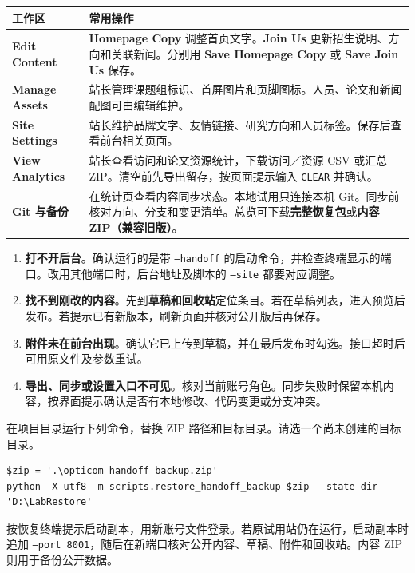\documentclass[UTF8,a4paper,zihao=-4,fontset=none]{ctexart}
\newcommand{\key}[1]{\textsf{\textbf{#1}}}
\newcommand{\topic}[1]{\par\vspace{9pt}{\large\sffamily\bfseries\color{navy}#1}\par\vspace{1pt}}
\begin{document}
\begin{tabularx}{\linewidth}{@{}p{31mm}Y@{}}
\toprule
\key{工作区} & \key{常用操作} \\
\midrule
\key{Edit Content} & \key{Homepage Copy} 调整首页文字。\key{Join Us} 更新招生说明、方向和关联新闻。分别用 \key{Save Homepage Copy} 或 \key{Save Join Us} 保存。 \\
\key{Manage Assets} & 站长管理课题组标识、首屏图片和页脚图标。人员、论文和新闻配图可由编辑维护。 \\
\key{Site Settings} & 站长维护品牌文字、友情链接、研究方向和人员标签。保存后查看前台相关页面。 \\
\key{View Analytics} & 站长查看访问和论文资源统计，下载访问／资源 CSV 或汇总 ZIP。清空前先导出留存，按页面提示输入 \texttt{CLEAR} 并确认。 \\
\key{Git 与备份} & 在统计页查看内容同步状态。本地试用只连接本机 Git。同步前核对方向、分支和变更清单。总览可下载\key{完整恢复包}或\key{内容 ZIP（兼容旧版）}。 \\
\bottomrule
\end{tabularx}

\topic{遇到问题时}

\begin{enumerate}
  \item \key{打不开后台}。确认运行的是带 \texttt{--handoff} 的启动命令，并检查终端显示的端口。改用其他端口时，后台地址及脚本的 \texttt{--site} 都要对应调整。
  \item \key{找不到刚改的内容}。先到\key{草稿和回收站}定位条目。若在草稿列表，进入预览后发布。若提示已有新版本，刷新页面并核对公开版后再保存。
  \item \key{附件未在前台出现}。确认它已上传到草稿，并在最后发布时勾选。接口超时后可用原文件及参数重试。
  \item \key{导出、同步或设置入口不可见}。核对当前账号角色。同步失败时保留本机内容，按界面提示确认是否有本地修改、代码变更或分支冲突。
\end{enumerate}

\topic{从完整恢复包接续}

在项目目录运行下列命令，替换 ZIP 路径和目标目录。请选一个尚未创建的目标目录。

\begin{Verbatim}[fontsize=\footnotesize]
$zip = '.\opticom_handoff_backup.zip'
python -X utf8 -m scripts.restore_handoff_backup $zip --state-dir 'D:\LabRestore'
\end{Verbatim}

按恢复终端提示启动副本，用新账号文件登录。若原试用站仍在运行，启动副本时追加 \texttt{--port 8001}，随后在新端口核对公开内容、草稿、附件和回收站。内容 ZIP 则用于备份公开数据。
\end{document}

